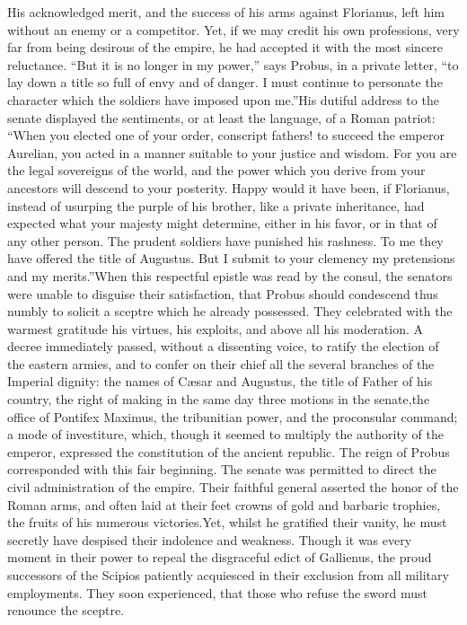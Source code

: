 His acknowledged merit, and the success of his arms against
Florianus, left him without an enemy or a competitor. Yet, if we
may credit his own professions, very far from being desirous of
the empire, he had accepted it with the most sincere reluctance.
“But it is no longer in my power,” says Probus, in a private
letter, “to lay down a title so full of envy and of danger. I
must continue to personate the character which the soldiers have
imposed upon me.”\footnotemark[25] His dutiful address to the senate displayed
the sentiments, or at least the language, of a Roman patriot:
“When you elected one of your order, conscript fathers! to
succeed the emperor Aurelian, you acted in a manner suitable to
your justice and wisdom. For you are the legal sovereigns of the
world, and the power which you derive from your ancestors will
descend to your posterity. Happy would it have been, if
Florianus, instead of usurping the purple of his brother, like a
private inheritance, had expected what your majesty might
determine, either in his favor, or in that of any other person.
The prudent soldiers have punished his rashness. To me they have
offered the title of Augustus. But I submit to your clemency my
pretensions and my merits.”\footnotemark[26] When this respectful epistle was
read by the consul, the senators were unable to disguise their
satisfaction, that Probus should condescend thus numbly to
solicit a sceptre which he already possessed. They celebrated
with the warmest gratitude his virtues, his exploits, and above
all his moderation. A decree immediately passed, without a
dissenting voice, to ratify the election of the eastern armies,
and to confer on their chief all the several branches of the
Imperial dignity: the names of Cæsar and Augustus, the title of
Father of his country, the right of making in the same day three
motions in the senate,\footnotemark[27] the office of Pontifex Maximus, the
tribunitian power, and the proconsular command; a mode of
investiture, which, though it seemed to multiply the authority of
the emperor, expressed the constitution of the ancient republic.
The reign of Probus corresponded with this fair beginning. The
senate was permitted to direct the civil administration of the
empire. Their faithful general asserted the honor of the Roman
arms, and often laid at their feet crowns of gold and barbaric
trophies, the fruits of his numerous victories.\footnotemark[28] Yet, whilst he
gratified their vanity, he must secretly have despised their
indolence and weakness. Though it was every moment in their power
to repeal the disgraceful edict of Gallienus, the proud
successors of the Scipios patiently acquiesced in their exclusion
from all military employments. They soon experienced, that those
who refuse the sword must renounce the sceptre.

